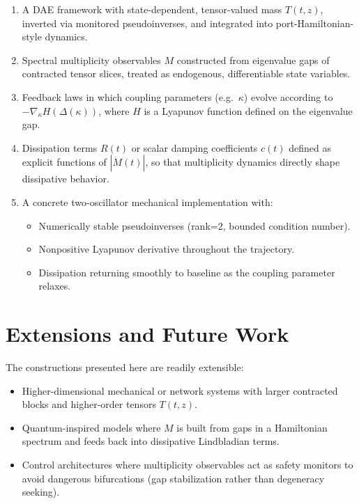 \documentclass[11pt]{article}
\begin{document}
\begin{enumerate}[label=(\arabic*)]
  \item A DAE framework with state-dependent, tensor-valued mass $T(t,z)$, inverted via monitored pseudoinverses, and integrated into port-Hamiltonian-style dynamics.
  \item Spectral multiplicity observables $M$ constructed from eigenvalue gaps of contracted tensor slices, treated as endogenous, differentiable state variables.
  \item Feedback laws in which coupling parameters (e.g.\ $\kappa$) evolve according to $-\nabla_\kappa H(\Delta(\kappa))$, where $H$ is a Lyapunov function defined on the eigenvalue gap.
  \item Dissipation terms $R(t)$ or scalar damping coefficients $c(t)$ defined as explicit functions of $|\dot M(t)|$, so that multiplicity dynamics directly shape dissipative behavior.
  \item A concrete two-oscillator mechanical implementation with:
  \begin{itemize}
    \item Numerically stable pseudoinverses (rank=2, bounded condition number).
    \item Nonpositive Lyapunov derivative throughout the trajectory.
    \item Dissipation returning smoothly to baseline as the coupling parameter relaxes.
  \end{itemize}
\end{enumerate}

\section{Extensions and Future Work}

The constructions presented here are readily extensible:

\begin{itemize}
  \item Higher-dimensional mechanical or network systems with larger contracted blocks and higher-order tensors $T(t,z)$.
  \item Quantum-inspired models where $M$ is built from gaps in a Hamiltonian spectrum and feeds back into dissipative Lindbladian terms.
  \item Control architectures where multiplicity observables act as safety monitors to avoid dangerous bifurcations (gap stabilization rather than degeneracy seeking).
\end{itemize}
\end{document}
